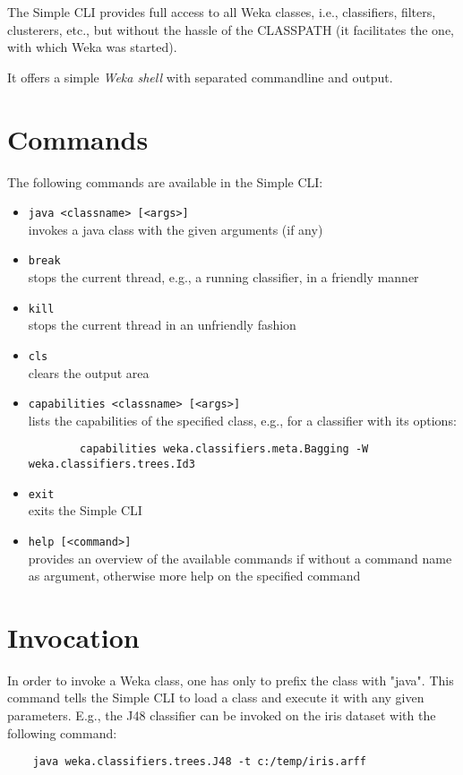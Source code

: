 
The Simple CLI provides full access to all Weka classes, i.e., classifiers, filters, clusterers, etc., but without the hassle of the CLASSPATH (it facilitates the one, with which Weka was started).

It offers a simple \textit{Weka shell} with separated commandline and output.

\begin{center}
\end{center}


\section{Commands}
The following commands are available in the Simple CLI:
\begin{itemize}
	\item \texttt{java <classname> [<args>]} \\
		invokes a java class with the given arguments (if any)
	\item \texttt{break} \\
		stops the current thread, e.g., a running classifier, in a friendly manner
	\item \texttt{kill} \\
		stops the current thread in an unfriendly fashion
	\item \texttt{cls} \\
		clears the output area
	\item \texttt{capabilities <classname> [<args>]} \\
		lists the capabilities of the specified class, e.g., for a classifier
		with its options:
		{\small \begin{verbatim}
 		capabilities weka.classifiers.meta.Bagging -W weka.classifiers.trees.Id3
		\end{verbatim}}
	\item \texttt{exit} \\
		exits the Simple CLI
	\item \texttt{help [<command>]} \\
		provides an overview of the available commands if without a command name as argument, otherwise more help on the specified command
\end{itemize}


\section{Invocation}
In order to invoke a Weka class, one has only to prefix the class with "java". This command tells the Simple CLI to load a class and execute it with any given parameters. E.g., the J48 classifier can be invoked on the iris dataset with the following command:
\begin{verbatim}
	java weka.classifiers.trees.J48 -t c:/temp/iris.arff
\end{verbatim}

